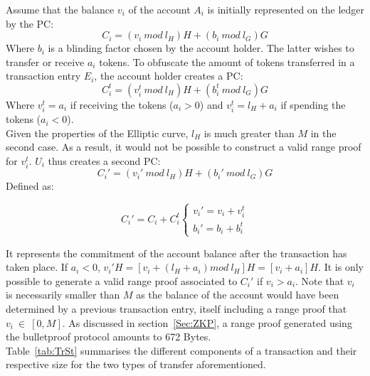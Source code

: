 Assume that the balance  $v_i$ of the account $A_i$ is initially represented on the ledger by the PC: 
\begin{equation}
C_{i}=(v_i~mod~l_H)H+ (b_i~mod~l_G)G
\end{equation}
Where $b_i$ is a blinding factor chosen by the account holder.  The latter wishes to transfer or receive $a_i$ tokens. To obfuscate the amount of tokens transferred in a transaction entry $E_i$, the account holder creates a PC: 
\begin{equation}
C_i^{t} = (v_i^{t}~mod~l_H)H+ (b_i^{t}~mod~l_G)G
\end{equation}
Where $v_i^{t} = a_i$ if receiving the tokens ($a_i > 0$) and $v_i^{t} = l_H+a_i$ if spending the tokens ($a_i<0$).\\

Given the properties of the Elliptic curve, $l_H$ is much greater than $M$ in the second case. As a result, it would not be possible to construct a valid range proof for $v_i^{t}$. $U_i$ thus creates a second PC:
\begin{equation} 
C_{i}'=(v_i'~mod~l_H)H+ (b_i'~mod~l_G)G
\end{equation}
Defined as:
\begin{center}
\[
  C_{i}' = C_i + C_i^{t}\begin{cases}
               v_i' = v_i + v_i^t\\
               b_i' = b_i + b_i^t
            \end{cases}
\]
\end{center}
It represents the commitment of the account balance after the transaction has taken place.  If $a_i<0$, $v_i'H = [v_i + (l_H+a_i)mod~l_H]H = [v_i + a_i]H$. It is only possible to generate a valid range proof associated to $C_{i}'$ if $v_i > a_i$. Note that $v_i$ is necessarily smaller than $M$ as the balance of the account would have been determined by a previous transaction entry, itself including a range proof that $v_i~\in~[0,M]$. As discussed in section~\ref{Sec:ZKP}, a range proof generated using the bulletproof protocol amounts to 672 Bytes.  \\

Table~\ref{tab:TrSt} summarises the different components of a transaction and their respective size for the two types of transfer aforementioned. \\

